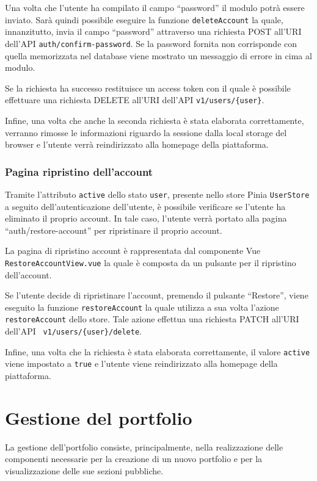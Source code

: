 Una volta che l'utente ha compilato il campo ``password'' il modulo potr\`a essere inviato. Sar\`a quindi possibile eseguire la funzione \verb|deleteAccount| la quale, innanzitutto, invia il campo ``password'' attraverso una richiesta POST all'URI dell'API \verb|auth/confirm-password|. Se la password fornita non corrisponde con quella memorizzata nel database viene mostrato un messaggio di errore in cima al modulo. 

Se la richiesta ha successo restituisce un access token con il quale \`e possibile effettuare una richiesta DELETE all'URI dell'API \verb|v1/users/{user}|. 

Infine, una volta che anche la seconda richiesta \`e stata elaborata correttamente, verranno rimosse le informazioni riguardo la sessione dalla local storage del browser e l'utente verr\`a reindirizzato alla homepage della piattaforma.

\subsubsection{Pagina ripristino dell'account}
Tramite l'attributo \verb|active| dello stato \verb|user|, presente nello store Pinia \verb|UserStore| a seguito dell'autenticazione dell'utente, \`e possibile verificare se l'utente ha eliminato il proprio account. In tale caso, l'utente verr\`a portato alla pagina ``auth/restore-account'' per ripristinare il proprio account.

La pagina di ripristino account \`e rappresentata dal componente Vue \verb|RestoreAccountView.vue| la quale \`e composta da un pulsante per il ripristino dell'account.


Se l'utente decide di ripristinare l'account, premendo il pulsante ``Restore'', viene eseguito la funzione \verb|restoreAccount| la quale utilizza a sua volta l'azione \verb|restoreAccount| dello store. Tale azione effettua una richiesta PATCH all'URI dell'API \verb| v1/users/{user}/delete|.

Infine, una volta che la richiesta \`e stata elaborata correttamente, il valore \verb|active| viene impostato a \verb|true| e l'utente viene reindirizzato alla homepage della piattaforma.

\section{Gestione del portfolio}
La gestione dell'portfolio consiste, principalmente, nella realizzazione delle componenti necessarie per la creazione di un nuovo portfolio e per la visualizzazione delle sue sezioni pubbliche.

